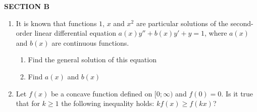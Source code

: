 \documentclass[12pt,a4paper]{article}
\begin{document}
\textbf{SECTION B}

\begin{enumerate}[resume]

\item It is known that functions $1$, $x$ and $x^2$  are particular solutions of the second-order linear differential equation  $a(x)y''+b(x)y'+y=1$,  where $a(x)$  and $b(x)$  are continuous functions.
\begin{enumerate}
\item  Find the general solution of this equation
\item  Find $a(x)$ and  $b(x)$
\end{enumerate}
\item Let $f(x)$ be a concave function defined on $[0;\infty)$  and $f(0)=0$. Is it true that for $k \geq 1$ the following inequality holds: $kf(x)\geq f(kx)$?


\end{enumerate}
\end{document}
